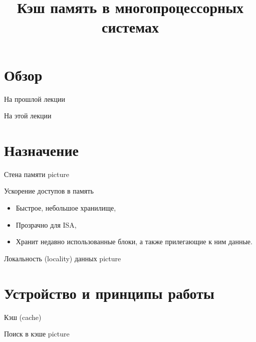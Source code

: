 

\title{Кэш память в многопроцессорных системах}



\begin{frame}
\titlepage
\end{frame}

\section*{Обзор}

\begin{frame}{На прошлой лекции}
\end{frame}

\begin{frame}{На этой лекции}
\tableofcontents
\end{frame}

\section{Назначение}

\begin{frame}{Стена памяти}
\todo picture
\end{frame}

\begin{frame}{Ускорение доступов в память}
\begin{itemize}
    \item Быстрое, небольшое хранилище,
    \item Прозрачно для ISA,
    \item Хранит недавно использованные блоки, а также прилегающие к ним данные.
\end{itemize}
\end{frame}

\begin{frame}{Локальность (\abbr locality) данных}
\todo picture
\end{frame}

\section{Устройство и принципы работы}

\begin{frame}{Кэш (\abbr cache)}
\centering
{}
\end{frame}

\begin{frame}{Поиск в кэше}
\todo picture
\end{frame}

